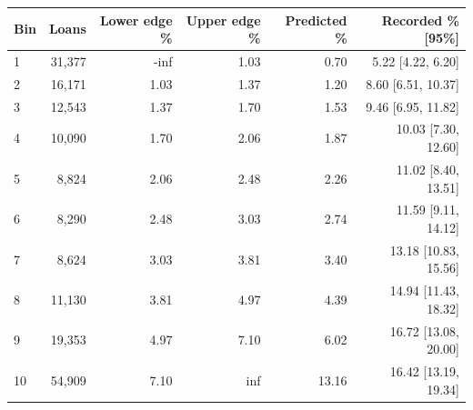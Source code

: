 \begingroup\small\setlength{\tabcolsep}{3pt}
\begin{tabularx}{\linewidth}{Xrrrrr}\toprule
Bin & Loans & Lower edge \% & Upper edge \% & Predicted \% & Recorded \% [95\%] \\ \midrule
1 & 31,377 & -inf & 1.03 & 0.70 & 5.22 [4.22, 6.20] \\
2 & 16,171 & 1.03 & 1.37 & 1.20 & 8.60 [6.51, 10.37] \\
3 & 12,543 & 1.37 & 1.70 & 1.53 & 9.46 [6.95, 11.82] \\
4 & 10,090 & 1.70 & 2.06 & 1.87 & 10.03 [7.30, 12.60] \\
5 & 8,824 & 2.06 & 2.48 & 2.26 & 11.02 [8.40, 13.51] \\
6 & 8,290 & 2.48 & 3.03 & 2.74 & 11.59 [9.11, 14.12] \\
7 & 8,624 & 3.03 & 3.81 & 3.40 & 13.18 [10.83, 15.56] \\
8 & 11,130 & 3.81 & 4.97 & 4.39 & 14.94 [11.43, 18.32] \\
9 & 19,353 & 4.97 & 7.10 & 6.02 & 16.72 [13.08, 20.00] \\
10 & 54,909 & 7.10 & inf & 13.16 & 16.42 [13.19, 19.34] \\
\bottomrule\end{tabularx}\endgroup
